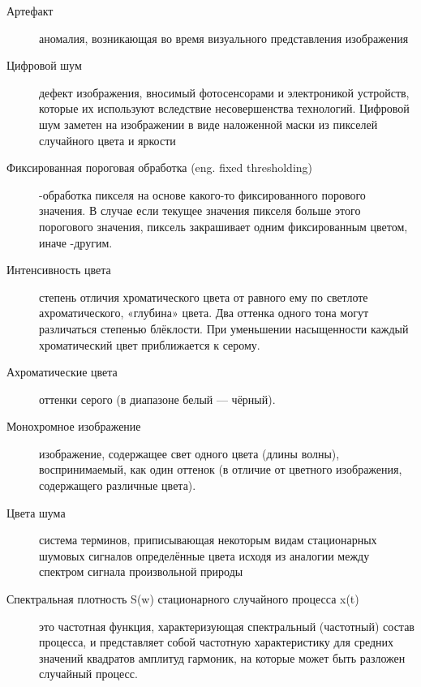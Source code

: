 \Defines %
\begin{description}
\item[Артефакт] 
 аномалия, возникающая во время визуального представления изображения\cite{Wiki}
\item[Цифровой шум] дефект изображения, вносимый фотосенсорами и электроникой устройств, которые их используют вследствие несовершенства технологий.
Цифровой шум заметен на изображении в виде наложенной маски из пикселей случайного цвета и яркости\cite{Wiki}

\item[Фиксированная пороговая обработка (eng. fixed thresholding)] -обработка пикселя на основе какого-то фиксированного порового значения. В случае если текущее значения пикселя больше этого порогового значения, пиксель закрашивает одним фиксированным цветом, иначе -другим. 
\cite{Dh}
\item[Интенсивность цвета]  степень отличия хроматического цвета от равного ему по светлоте ахроматического, «глубина» цвета. Два оттенка одного тона могут различаться степенью блёклости. При уменьшении насыщенности каждый хроматический цвет приближается к серому.\cite{Wiki}
\item[Ахроматические цвета] оттенки серого (в диапазоне белый — чёрный).\cite{Wiki}
\item[Монохромное изображение] изображение, содержащее свет одного цвета (длины волны), воспринимаемый, как один оттенок (в отличие от цветного изображения, содержащего различные цвета).\cite{Wiki}
\item[Цвета шума]система терминов, приписывающая некоторым видам стационарных шумовых сигналов определённые цвета исходя из аналогии между спектром сигнала произвольной природы 
\item[Спектральная плотность S(w) стационарного случайного процесса x(t) ] это частотная функция, характеризующая спектральный (частотный) состав процесса, и представляет собой частотную характеристику для средних значений квадратов амплитуд гармоник, на которые может быть разложен случайный процесс.\cite{Wiki}



\end{description}

